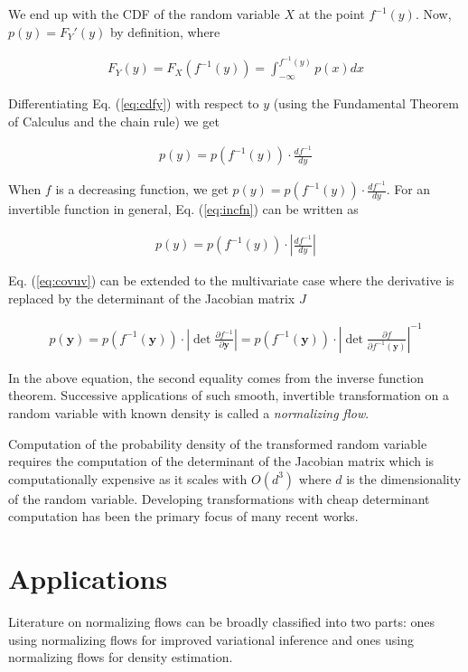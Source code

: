 \documentclass[runningheads]{llncs}
\begin{document}
We end up with the CDF of the random variable $X$ at the point $f^{-1}(y)$. Now, $p(y) = F_{Y}'(y)$ by definition, where

\begin{align}
F_{Y}(y) = F_{X}( f^{-1}(y)) = \int_{-\infty}^{ f^{-1}(y)}p(x) dx
\label{eq:cdfy}
\end{align}

Differentiating Eq. (\ref{eq:cdfy}) with respect to $y$ (using the Fundamental Theorem of Calculus and the chain rule) we get

\begin{align}
p(y) = p(f^{-1}(y))\cdot \frac{df^{-1}}{dy}
\label{eq:incfn}
\end{align}

When $f$ is a decreasing function, we get $p(y) = p(f^{-1}(y))\cdot \frac{df^{-1}}{dy}$.  For an invertible function in general, Eq. (\ref{eq:incfn}) can be written as 

\begin{align}
p(y) = p(f^{-1}(y))\cdot \left|\frac{df^{-1}}{dy}\right|
\label{eq:covuv}
\end{align}

Eq. (\ref{eq:covuv}) can be extended to the multivariate case where the derivative is replaced by the determinant of the Jacobian matrix $J$

\begin{align}
p(\mathbf{y}) = p(f^{-1}(\mathbf{y}))\cdot \left|\det\frac{\partial f^{-1}}{\partial\mathbf{y}}\right| = p(f^{-1}(\mathbf{y}))\cdot \left|\det\frac{\partial f}{\partial f^{-1}(\mathbf{y})}\right|^{-1}
\label{eq:covmv}
\end{align}

In the above equation, the second equality comes from the inverse function theorem. Successive applications of such smooth, invertible transformation on a random variable with known density is called a \textit{normalizing flow}.

 Computation of the probability density of the transformed random variable requires the computation of the determinant of the Jacobian matrix which is computationally expensive as it scales with $O(d^3)$ where $d$ is the dimensionality of the random variable. Developing transformations with cheap determinant computation has been the primary focus of many recent works.
\section{Applications}
Literature on normalizing flows can be broadly classified into two parts: ones using normalizing flows for improved variational inference and ones using normalizing flows for density estimation.
\end{document}
